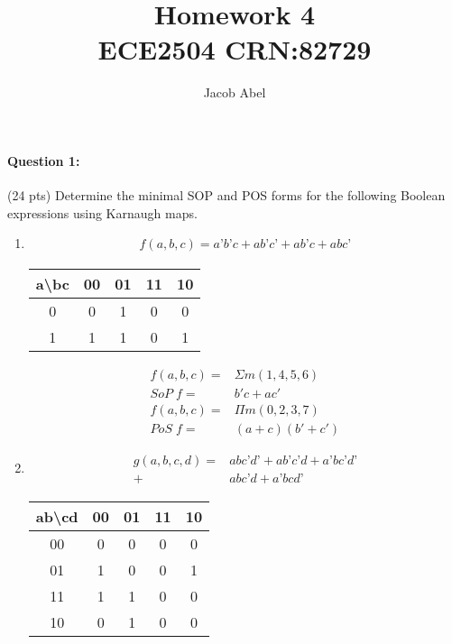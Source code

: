 \documentclass[12pt,letterpaper,titlepage]{report}
\author{Jacob Abel}
\title{%
	Homework 4
	\\\large ECE2504 CRN:82729
}
\begin{document}
\maketitle
\begin{raggedright}
\paragraph{Question 1:}
(24 pts) Determine the minimal SOP and POS forms for the following Boolean expressions using Karnaugh maps.
\begin{multicols*}{2}\raggedcolumns
\begin{enumerate}[noitemsep, label=\alph*)]
\item \begin{align*}
	      f(a,b,c) = a’b’c + ab’c’ + ab’c + abc’
	  \end{align*}
\begin{center}
\begin{tabular}{|c||c|c|c|c|}\hline
a\textbackslash bc
  & 00 & 01 & 11 & 10 \\\hline\hline
0 &  0 &  1 &  0 &  0 \\\hline
1 &  1 &  1 &  0 &  1 \\\hline 
\end{tabular}
\end{center}
\begin{align*}
f(a,b,c) =& \Sigma m(1,4,5,6)\\
 SoP\; f =&  b'c+ac'\\
f(a,b,c) =& \Pi m(0,2, 3, 7) \\
 PoS\; f =&  (a+c)(b'+c')
\end{align*}
\item \begin{align*}
	      g(a,b,c,d) =& abc’d’ + ab’c’d + a’bc’d’ 
	      		   \\+& abc’d + a’bcd’ 
	  \end{align*}
\begin{center}
\begin{tabular}{|c||c|c|c|c|}\hline
ab\textbackslash cd
   & 00 & 01 & 11 & 10 \\\hline\hline
00 &  0 &  0 &  0 &  0 \\\hline
01 &  1 &  0 &  0 &  1 \\\hline 
11 &  1 &  1 &  0 &  0 \\\hline
10 &  0 &  1 &  0 &  0 \\\hline
\end{tabular}
\end{center}

\end{enumerate}
\end{multicols*}
\end{raggedright}
\end{document}
